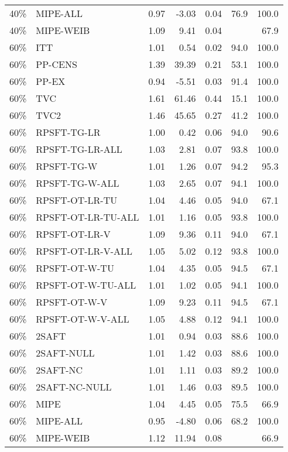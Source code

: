 \begin{table}[ht]
{\begin{tabular}{llrrrrr}
  40\% & MIPE-ALL & 0.97 & -3.03 & 0.04 & 76.9 & 100.0 \\ 
  40\% & MIPE-WEIB & 1.09 & 9.41 & 0.04 &  & 67.9 \\ 
   \hline
60\% & ITT & 1.01 & 0.54 & 0.02 & 94.0 & 100.0 \\ 
  60\% & PP-CENS & 1.39 & 39.39 & 0.21 & 53.1 & 100.0 \\ 
  60\% & PP-EX & 0.94 & -5.51 & 0.03 & 91.4 & 100.0 \\ 
  60\% & TVC & 1.61 & 61.46 & 0.44 & 15.1 & 100.0 \\ 
  60\% & TVC2 & 1.46 & 45.65 & 0.27 & 41.2 & 100.0 \\ 
   \hline
60\% & RPSFT-TG-LR & 1.00 & 0.42 & 0.06 & 94.0 & 90.6 \\ 
  60\% & RPSFT-TG-LR-ALL & 1.03 & 2.81 & 0.07 & 93.8 & 100.0 \\ 
  60\% & RPSFT-TG-W & 1.01 & 1.26 & 0.07 & 94.2 & 95.3 \\ 
  60\% & RPSFT-TG-W-ALL & 1.03 & 2.65 & 0.07 & 94.1 & 100.0 \\ 
  60\% & RPSFT-OT-LR-TU & 1.04 & 4.46 & 0.05 & 94.0 & 67.1 \\ 
  60\% & RPSFT-OT-LR-TU-ALL & 1.01 & 1.16 & 0.05 & 93.8 & 100.0 \\ 
  60\% & RPSFT-OT-LR-V & 1.09 & 9.36 & 0.11 & 94.0 & 67.1 \\ 
  60\% & RPSFT-OT-LR-V-ALL & 1.05 & 5.02 & 0.12 & 93.8 & 100.0 \\ 
   \hline
60\% & RPSFT-OT-W-TU & 1.04 & 4.35 & 0.05 & 94.5 & 67.1 \\ 
  60\% & RPSFT-OT-W-TU-ALL & 1.01 & 1.02 & 0.05 & 94.1 & 100.0 \\ 
  60\% & RPSFT-OT-W-V & 1.09 & 9.23 & 0.11 & 94.5 & 67.1 \\ 
  60\% & RPSFT-OT-W-V-ALL & 1.05 & 4.88 & 0.12 & 94.1 & 100.0 \\ 
   \hline
60\% & 2SAFT & 1.01 & 0.94 & 0.03 & 88.6 & 100.0 \\ 
  60\% & 2SAFT-NULL & 1.01 & 1.42 & 0.03 & 88.6 & 100.0 \\ 
  60\% & 2SAFT-NC & 1.01 & 1.11 & 0.03 & 89.2 & 100.0 \\ 
  60\% & 2SAFT-NC-NULL & 1.01 & 1.46 & 0.03 & 89.5 & 100.0 \\ 
  60\% & MIPE & 1.04 & 4.45 & 0.05 & 75.5 & 66.9 \\ 
  60\% & MIPE-ALL & 0.95 & -4.80 & 0.06 & 68.2 & 100.0 \\ 
  60\% & MIPE-WEIB & 1.12 & 11.94 & 0.08 &  & 66.9 \\ 
   \hline
\end{tabular}
}
\end{table}
